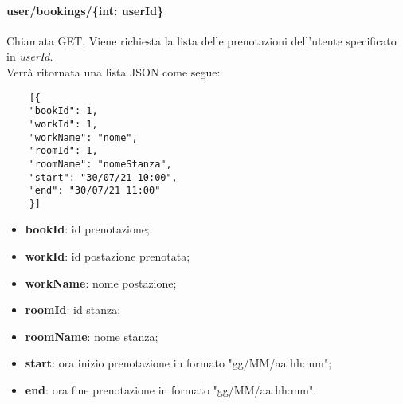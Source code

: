 \paragraph{user/bookings/\{int: userId\}}
Chiamata GET. Viene richiesta la lista delle prenotazioni dell'utente specificato in \textit{userId}.\\
Verrà ritornata una lista JSON come segue:
\begin{center}
	\begin{lstlisting}
	[{
	"bookId": 1,
	"workId": 1,
	"workName": "nome",
	"roomId": 1,
	"roomName": "nomeStanza",
	"start": "30/07/21 10:00",
	"end": "30/07/21 11:00"
	}]
	\end{lstlisting}
\end{center}
\begin{itemize}
	\item \textbf{bookId}: id prenotazione;
	\item \textbf{workId}: id postazione prenotata;
	\item \textbf{workName}: nome postazione;
	\item \textbf{roomId}: id stanza;
	\item \textbf{roomName}: nome stanza;	
	\item \textbf{start}: ora inizio prenotazione in formato "gg/MM/aa hh:mm";	
	\item \textbf{end}: ora fine prenotazione in formato "gg/MM/aa hh:mm".
\end{itemize}